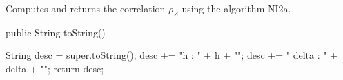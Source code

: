 \begin{tabb} Computes and returns the correlation $\rho_Z$ using the algorithm NI2a.
\end{tabb}
\begin{code}

   public String toString()\begin{hide}
   {
      String desc = super.toString();
      desc += "h :  " + h + "\n";
      desc += " delta : " + delta + "\n";
      return desc;
   }\end{hide}
\end{code}

\begin{code}\begin{hide}
}\end{hide}
\end{code}
